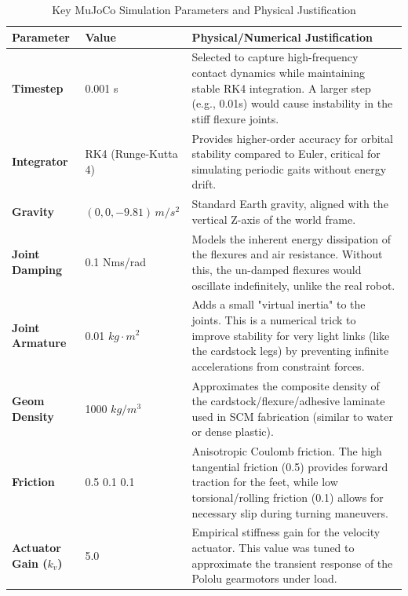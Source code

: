 \documentclass[11pt, a4paper]{article}
\begin{document}
\begin{table}[H]
    \centering
    \caption{Key MuJoCo Simulation Parameters and Physical Justification}
    \label{tab:mujoco-params}
    \begin{tabular}{p{} p{} p{}}
        \toprule
        \textbf{Parameter} & \textbf{Value} & \textbf{Physical/Numerical Justification} \\
        \midrule
        \textbf{Timestep} & 0.001 s & Selected to capture high-frequency contact dynamics while maintaining stable RK4 integration. A larger step (e.g., 0.01s) would cause instability in the stiff flexure joints. \\
        \midrule
        \textbf{Integrator} & RK4 (Runge-Kutta 4) & Provides higher-order accuracy for orbital stability compared to Euler, critical for simulating periodic gaits without energy drift. \\
        \midrule
        \textbf{Gravity} & $(0, 0, -9.81) \, m/s^2$ & Standard Earth gravity, aligned with the vertical Z-axis of the world frame. \\
        \midrule
        \textbf{Joint Damping} & 0.1 Nms/rad & Models the inherent energy dissipation of the flexures and air resistance. Without this, the un-damped flexures would oscillate indefinitely, unlike the real robot. \\
        \midrule
        \textbf{Joint Armature} & 0.01 $kg \cdot m^2$ & Adds a small "virtual inertia" to the joints. This is a numerical trick to improve stability for very light links (like the cardstock legs) by preventing infinite accelerations from constraint forces. \\
        \midrule
        \textbf{Geom Density} & 1000 $kg/m^3$ & Approximates the composite density of the cardstock/flexure/adhesive laminate used in SCM fabrication (similar to water or dense plastic). \\
        \midrule
        \textbf{Friction} & 0.5 0.1 0.1 & Anisotropic Coulomb friction. The high tangential friction (0.5) provides forward traction for the feet, while low torsional/rolling friction (0.1) allows for necessary slip during turning maneuvers. \\
        \midrule
        \textbf{Actuator Gain ($k_v$)} & 5.0 & Empirical stiffness gain for the velocity actuator. This value was tuned to approximate the transient response of the Pololu gearmotors under load. \\
        \bottomrule
    \end{tabular}
\end{table}
\end{document}
